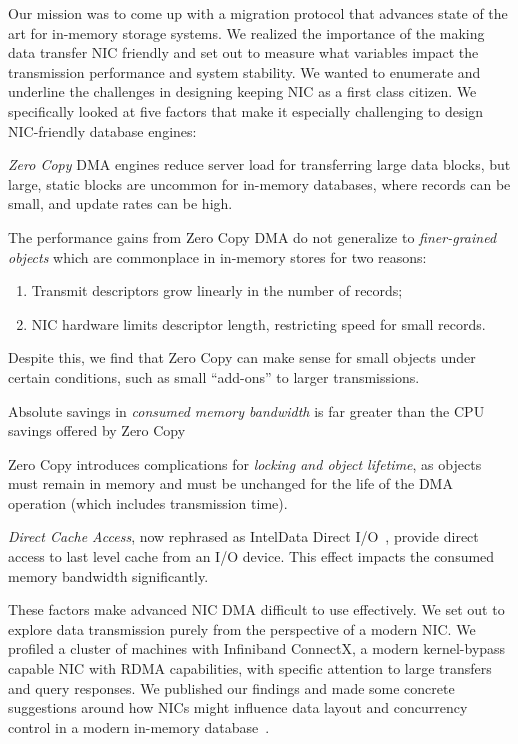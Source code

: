 Our mission was to come up with a migration protocol that advances state of the art for in-memory storage systems.
We realized the importance of the making data transfer NIC friendly and set out to measure what variables impact the 
transmission performance and system stability. We wanted to enumerate and underline the challenges in designing keeping NIC as a first class citizen.
We specifically looked at five factors that make it especially challenging to design NIC-friendly
database engines:
\begin{myitemize}
  \item {\em Zero Copy} DMA engines reduce server load for transferring large data
    blocks, but large, static blocks are uncommon for in-memory databases,
    where records can be small, and update rates can be high.
  \item The performance gains from Zero Copy DMA do not generalize to
      {\em finer-grained objects} which are commonplace in in-memory stores for two reasons:
      \begin{enumerate}
        \item Transmit descriptors grow linearly in the number of records;
        \item NIC hardware limits descriptor length, restricting speed for small records.
      \end{enumerate}
      Despite this, we find that Zero Copy can make sense for small objects under certain conditions, such as
      small ``add-ons'' to larger transmissions.
   \item Absolute savings in {\em consumed memory bandwidth} is far greater than the CPU savings 
       offered by Zero Copy
   \item Zero Copy introduces complications for \emph{locking and object
      lifetime}, as objects must remain in memory and must be
      unchanged for the life of the DMA operation (which includes transmission
      time).
  \item {\em Direct Cache Access}, now rephrased as Intel\textregistered Data Direct I/O~\cite{ddio},
      provide direct access to last level cache from an I/O device. This effect
      impacts the consumed memory bandwidth significantly.
\end{myitemize}


These factors make advanced NIC DMA difficult to use effectively. We set out to explore data 
transmission purely from the perspective of a modern NIC. We profiled a cluster of machines with
Infiniband ConnectX, a modern kernel-bypass capable NIC
with RDMA capabilities, with specific attention to large transfers and query responses.
We published our findings and made some concrete suggestions around how NICs might
influence data layout and concurrency control in a modern in-memory 
database~\cite{imdmpaper}. 


